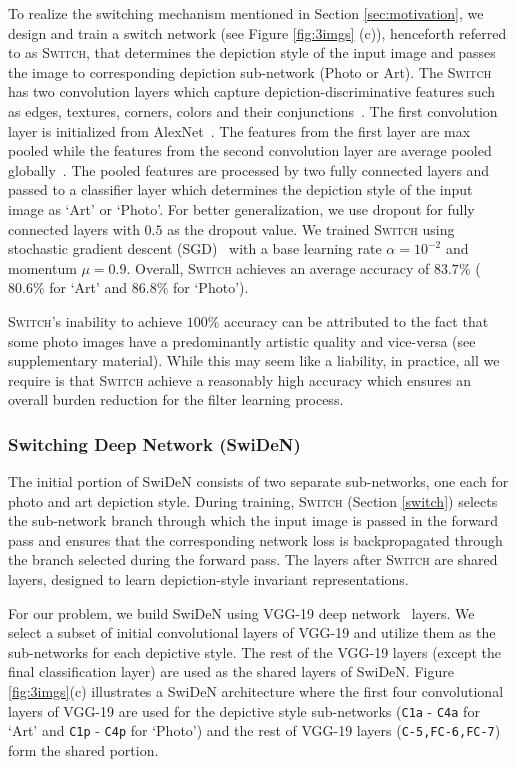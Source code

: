 \documentclass[preprint]{sig-alternate-05-2015}
\begin{document}
To realize the switching mechanism mentioned in Section \ref{sec:motivation}, we design and train a switch network (see Figure \ref{fig:3imgs} (c)), henceforth referred to as \textsc{Switch}, that determines the depiction style of the input image and passes the image to corresponding depiction sub-network (Photo or Art). The \textsc{Switch} has two convolution layers which capture depiction-discriminative features such as edges, textures, corners, colors and their  conjunctions~\cite{zeiler2014visualizing}.  The first convolution layer is initialized from AlexNet~\cite{krizhevsky2012imagenet}. The features from the first layer are max pooled while the features from the second convolution layer are average pooled globally~\cite{lin2013network}. The pooled features are processed by two fully connected layers and passed to a classifier layer which determines the depiction style of the input image as `Art' or `Photo'. For better generalization, we use dropout for fully connected layers with $0.5$ as the dropout value. We trained \textsc{Switch} using stochastic gradient descent (SGD)~\cite{krizhevsky2012imagenet} with a base learning rate $\alpha=10^{-2}$ and momentum $\mu=0.9$. Overall, \textsc{Switch} achieves an average accuracy of $83.7\%$ ($80.6\%$ for `Art' and $86.8\%$ for `Photo'). 

\textsc{Switch}'s inability to achieve $100\%$ accuracy can be attributed to the fact that some photo images have a predominantly artistic quality and vice-versa (see supplementary material). While this may seem like a liability, in practice, all we require is that \textsc{Switch} achieve a reasonably high accuracy which ensures an overall burden reduction for the filter learning process.

\subsubsection{\textbf{Switching Deep Network (SwiDeN)}}
\label{swiden}

The initial portion of SwiDeN consists of two separate sub-networks, one each for photo and art depiction style. During training, \textsc{Switch} (Section \ref{switch}) selects the sub-network branch through which the input image is passed in the forward pass and ensures that the corresponding network loss is backpropagated through the branch selected during the forward pass. The layers after \textsc{Switch} are shared layers, designed to learn   depiction-style invariant representations. 

For our problem, we build SwiDeN using VGG-19 deep network~\cite{Simonyan14c} layers. We select a subset of initial convolutional layers of VGG-19 and utilize them as the sub-networks for each depictive style. The rest of the VGG-19 layers (except the final classification layer) are used as the shared layers of SwiDeN. Figure \ref{fig:3imgs}(c) illustrates a SwiDeN architecture where the first four convolutional layers of VGG-19 are used for the depictive style sub-networks (\texttt{C1a} - \texttt{C4a} for `Art' and \texttt{C1p} - \texttt{C4p} for `Photo') and the rest of VGG-19 layers  (\texttt{C-5,FC-6,FC-7}) form the shared portion. 
\end{document}
